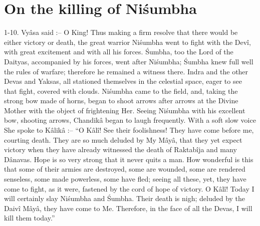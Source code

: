 ﻿\chapter{On the killing of Ni\'sumbha}

1-10. Vy\^asa said :-- O King! Thus making a firm resolve that there would be either victory or death, the great warrior Ni\'sumbha went to fight with the Dev\^i, with great excitement and with all his forces. \'Sumbha, too the Lord of the Daityas, accompanied by his forces, went after Ni\'sumbha; \'Sumbha knew full well the rules of warfare; therefore he remained a witness there. Indra and the other Devas and Yaksas, all stationed themselves in the celestial space, eager to see that fight, covered with clouds. Ni\'sumbha came to the field, and, taking the strong bow made of horns, began to shoot arrows after arrows at the Divine Mother with the object of frightening Her. Seeing Ni\'sumbha with his excellent bow, shooting arrows, Chandik\^a began to laugh frequently. With a soft slow voice She spoke to K\^alik\^a :-- ``O K\^al\^i! See their foolishness! They have come before me, courting death. They are so much deluded by My M\^ay\^a, that they yet expect victory when they have already witnessed the death of Raktab\^ija and many D\^anavas. Hope is so very strong that it never quits a man. How wonderful is this that some of their armies are destroyed, some are wounded, some are rendered senseless, some made powerless, some have fled; seeing all these, yet, they have come to fight, as it were, fastened by the cord of hope of victory. O K\^al\^i! Today I will certainly slay Ni\'sumbha and \'Sumbha. Their death is nigh; deluded by the Daiv\^i M\^ay\^a, they have come to Me. Therefore, in the face of all the Devas, I will kill them today.''

